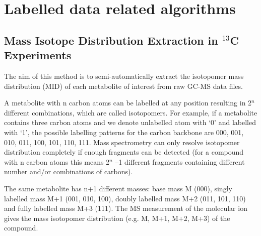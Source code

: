 

\chapter{Labelled data related algorithms}


\section
{Mass Isotope Distribution Extraction in $^{13}$C Experiments}


The aim of this method is to semi-automatically extract the isotopomer mass
distribution (MID) of each metabolite of interest from raw GC-MS data files.

A metabolite with n carbon atoms can be labelled at any position resulting in
2$^{n}$ different combinations, which are called isotopomers. For example, 
if a metabolite contains three carbon atoms and we denote unlabelled atom with
 ‘0’ and labelled with ‘1’, the possible labelling patterns for the carbon 
backbone are 000, 001, 010, 011, 100, 101, 110, 111. Mass spectrometry can only
resolve isotopomer distribution completely if enough fragments can be detected 
(for a compound with n carbon atoms this means 2$^{n}$ –1 different fragments 
containing different number and/or combinations of carbons).

The same metabolite has n+1 different masses: base mass M (000), singly labelled
mass M+1 (001, 010, 100), doubly labelled mass M+2 (011, 101, 110) and fully 
labelled mass M+3 (111). The MS measurement of the molecular ion gives the mass 
isotopomer distribution (e.g. M, M+1, M+2, M+3) of the compound.

